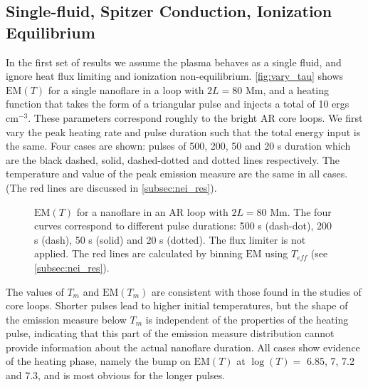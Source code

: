 \documentclass[apj]{emulateapj}
\begin{document}
	\subsection{Single-fluid, Spitzer Conduction, Ionization Equilibrium}
	\label{subsec:sf_sc_ie_res}
	\par In the first set of results we assume the plasma behaves as a single fluid, and ignore heat flux limiting and ionization non-equilibrium. \autoref{fig:vary_tau} shows $\mathrm{EM}(T)$ for a single nanoflare in a loop with $2L = 80$ Mm, and a heating function that takes the form of a triangular pulse and injects a total of 10 ergs cm$^{-3}$. These parameters correspond roughly to the bright AR core loops. We first vary the peak heating rate and pulse duration such that the total energy input is the same. Four cases are shown: pulses of 500, 200, 50 and 20 s duration which are the black dashed, solid, dashed-dotted and dotted lines respectively. The temperature and value of the peak emission measure are the same in all cases. (The red lines are discussed in \autoref{subsec:nei_res}).
	\begin{figure}
		\centering
		\caption{$\mathrm{EM}(T)$ for a nanoflare in an AR loop with $2L = 80$ Mm. The four curves correspond to different pulse durations: 500 s (dash-dot), 200 s (dash), 50 s (solid) and 20 s (dotted). The flux limiter is not applied. The red lines are calculated by binning $\mathrm{EM}$ using $T_{eff}$ (see \autoref{subsec:nei_res}).}
		\label{fig:vary_tau}
	\end{figure}
	\par The values of $T_m$ and $\mathrm{EM}(T_m)$ are consistent with those found in the studies of core loops. Shorter pulses lead to higher initial temperatures, but the shape of the emission measure below $T_m$ is independent of the properties of the heating pulse, indicating that this part of the emission measure distribution cannot provide information about the actual nanoflare duration.  All cases show evidence of the heating phase, namely the bump on $\mathrm{EM}(T)$ at $\log{(T)} =$ 6.85, 7, 7.2 and 7.3, and is most obvious for the longer pulses. 
\end{document}
